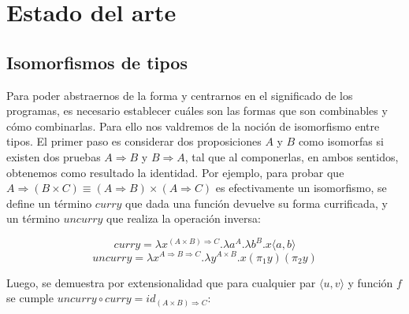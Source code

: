 \documentclass[]{report}
\begin{document}
	\section{Estado del arte}
	\subsection{Isomorfismos de tipos}
	
	Para poder abstraernos de la forma y centrarnos en el significado de los programas, es necesario establecer cuáles son las formas que son combinables y cómo combinarlas.
	Para ello nos valdremos de la noción de isomorfismo entre tipos.
	El primer paso es considerar dos proposiciones $A$ y $B$ como isomorfas si existen dos pruebas $A \Rightarrow B$ y $B \Rightarrow A$, tal que al componerlas, en ambos sentidos, obtenemos como resultado la identidad.
	Por ejemplo, para probar que $A \Rightarrow (B \times C) \equiv (A \Rightarrow B) \times (A \Rightarrow C)$ es efectivamente un isomorfismo, se define un término $curry$ que dada una función devuelve su forma currificada, y un término $uncurry$ que realiza la operación inversa:
	
	\[ curry = \lambda x^{(A \times B) \Rightarrow C}. \lambda a^A . \lambda b^B . x\langle a,b \rangle \]
	\[ uncurry = \lambda x^{A \Rightarrow B \Rightarrow C}. \lambda y^{A \times B} . x(\pi_1 y)(\pi_2 y) \]
	
	Luego, se demuestra por extensionalidad que para cualquier par $\langle u,v \rangle$ y función $f$ se cumple $uncurry \circ curry = id_{(A \times B) \Rightarrow C}$:
	
\end{document}
